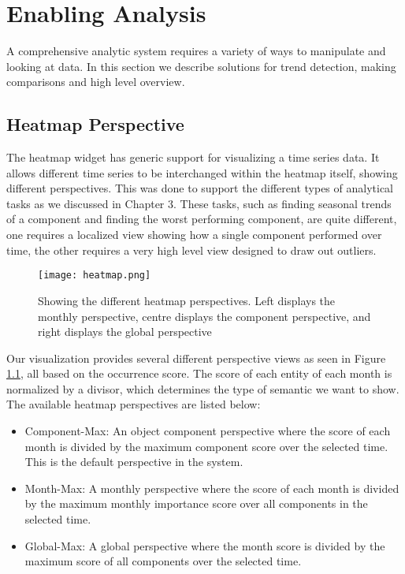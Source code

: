 %
\chapter{Enabling Analysis}
A comprehensive analytic system requires a variety of ways to manipulate and
looking at data. In this section we describe solutions for trend detection,
making comparisons and high level overview.
 

\section{Heatmap Perspective}
The heatmap widget has generic support for visualizing a time series data. It 
allows different time series to be interchanged within the heatmap itself, showing 
different perspectives. This was done to support the different types of
analytical tasks as we discussed in Chapter 3. These tasks, such as
finding seasonal trends of a component and finding the worst performing
component, are quite different, one requires a localized view showing how a
single component performed over time, the other requires a very high level view
designed to draw out outliers.

	\begin{figure}
	 \centering  
	 \texttt{[image: heatmap.png]}
	 \caption[Heatmap Perspectives]{Showing the different heatmap perspectives. Left
	 displays the monthly perspective, centre displays the component perspective, and right displays the
	 global perspective}
	 \label{figure:heatmap}
	\end{figure}


Our visualization provides several different perspective views as seen in
Figure \ref{figure:heatmap}, all based on the occurrence score. The score of
each entity of each month is normalized by a divisor, which determines the type of semantic we want to show. The available
heatmap perspectives are listed below:

\begin{itemize} [noitemsep]
  \item Component-Max: An object component perspective where the score of each
  month is divided by the maximum component score over the selected time. This
  is the default perspective in the system.
  
  \item Month-Max: A monthly perspective where the score of each month is 
  divided by the maximum monthly importance score over all components
  in the selected time.
  
  \item Global-Max: A global perspective where the month score is divided by the
  maximum score of all components over the selected time. 
\end{itemize}
 
